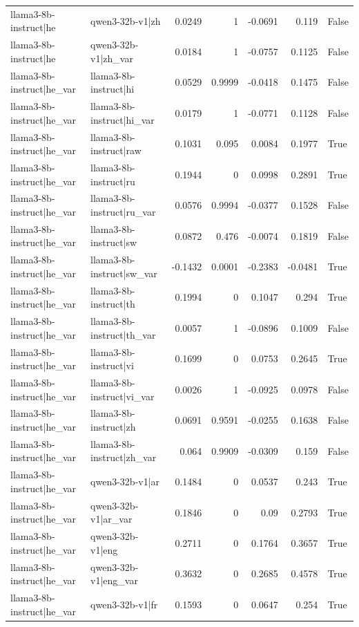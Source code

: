 \begin{table}
\begin{tabular}{l l r r r r l}
llama3-8b-instruct|he & qwen3-32b-v1|zh & 0.0249 & 1 & -0.0691 & 0.119 & False \\
llama3-8b-instruct|he & qwen3-32b-v1|zh_var & 0.0184 & 1 & -0.0757 & 0.1125 & False \\
llama3-8b-instruct|he_var & llama3-8b-instruct|hi & 0.0529 & 0.9999 & -0.0418 & 0.1475 & False \\
llama3-8b-instruct|he_var & llama3-8b-instruct|hi_var & 0.0179 & 1 & -0.0771 & 0.1128 & False \\
llama3-8b-instruct|he_var & llama3-8b-instruct|raw & 0.1031 & 0.095 & 0.0084 & 0.1977 & True \\
llama3-8b-instruct|he_var & llama3-8b-instruct|ru & 0.1944 & 0 & 0.0998 & 0.2891 & True \\
llama3-8b-instruct|he_var & llama3-8b-instruct|ru_var & 0.0576 & 0.9994 & -0.0377 & 0.1528 & False \\
llama3-8b-instruct|he_var & llama3-8b-instruct|sw & 0.0872 & 0.476 & -0.0074 & 0.1819 & False \\
llama3-8b-instruct|he_var & llama3-8b-instruct|sw_var & -0.1432 & 0.0001 & -0.2383 & -0.0481 & True \\
llama3-8b-instruct|he_var & llama3-8b-instruct|th & 0.1994 & 0 & 0.1047 & 0.294 & True \\
llama3-8b-instruct|he_var & llama3-8b-instruct|th_var & 0.0057 & 1 & -0.0896 & 0.1009 & False \\
llama3-8b-instruct|he_var & llama3-8b-instruct|vi & 0.1699 & 0 & 0.0753 & 0.2645 & True \\
llama3-8b-instruct|he_var & llama3-8b-instruct|vi_var & 0.0026 & 1 & -0.0925 & 0.0978 & False \\
llama3-8b-instruct|he_var & llama3-8b-instruct|zh & 0.0691 & 0.9591 & -0.0255 & 0.1638 & False \\
llama3-8b-instruct|he_var & llama3-8b-instruct|zh_var & 0.064 & 0.9909 & -0.0309 & 0.159 & False \\
llama3-8b-instruct|he_var & qwen3-32b-v1|ar & 0.1484 & 0 & 0.0537 & 0.243 & True \\
llama3-8b-instruct|he_var & qwen3-32b-v1|ar_var & 0.1846 & 0 & 0.09 & 0.2793 & True \\
llama3-8b-instruct|he_var & qwen3-32b-v1|eng & 0.2711 & 0 & 0.1764 & 0.3657 & True \\
llama3-8b-instruct|he_var & qwen3-32b-v1|eng_var & 0.3632 & 0 & 0.2685 & 0.4578 & True \\
llama3-8b-instruct|he_var & qwen3-32b-v1|fr & 0.1593 & 0 & 0.0647 & 0.254 & True \\

\end{tabular}
\end{table}
